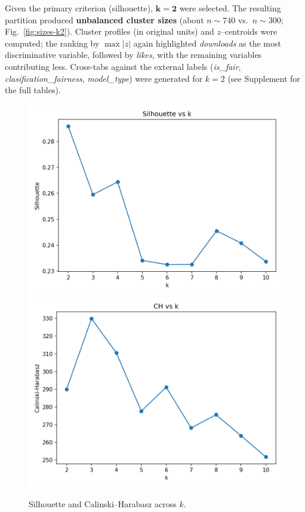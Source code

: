\documentclass[journal]{IEEEtran}
\begin{document}
Given the primary criterion (silhouette), $\mathbf{k=2}$ were selected.
The resulting partition produced \textbf{unbalanced cluster sizes} (about $n{\sim}740$ vs.\ $n{\sim}300$; Fig.~\ref{fig:sizes-k2}).
Cluster profiles (in original units) and $z$–centroids were computed; the ranking by $\max|z|$ again highlighted
\textit{downloads} as the most discriminative variable, followed by \textit{likes}, with the remaining variables contributing less.
Cross-tabs against the external labels (\textit{is\_fair}, \textit{clasification\_fairness}, \textit{model\_type}) were generated for $k{=}2$
(see Supplement for the full tables).


\begin{figure}[htbp]
	\centering
	\includegraphics[width=.48\linewidth]{assets/silhouette_vs_k.png}\hfill
	\includegraphics[width=.48\linewidth]{assets/ch_vs_k.png}
	\caption{Silhouette and Calinski--Harabasz across $k$.}
	\label{fig:silhouette-kmeans}\label{fig:ch-kmeans}
\end{figure}
\end{document}
